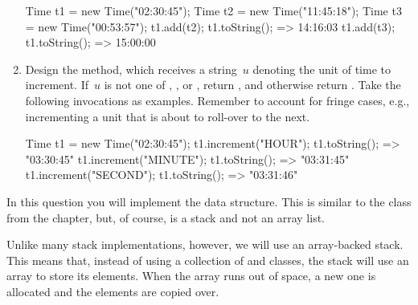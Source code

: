\begin{enumerate}[label=(\alph*)]
\begin{verbnobox}[\small]
Time t1 = new Time("02:30:45");
Time t2 = new Time("11:45:18");
Time t3 = new Time("00:53:57");
t1.add(t2);
t1.toString(); => 14:16:03
t1.add(t3);
t1.toString(); => 15:00:00
  \end{verbnobox}
  \item Design the  method, which receives a string~$u$ denoting the unit of time to increment. If~$u$ is not one of , , or , return , and otherwise return . Take the following invocations as examples. Remember to account for fringe cases, e.g., incrementing a unit that is about to roll-over to the next.
\begin{verbnobox}[\small]
Time t1 = new Time("02:30:45");
t1.increment("HOUR");
t1.toString(); => "03:30:45"
t1.increment("MINUTE");
t1.toString(); => "03:31:45"
t1.increment("SECOND");
t1.toString(); => "03:31:46"
\end{verbnobox}
\end{enumerate}



In this question you will implement the  data structure. This is similar to the  class from the chapter, but, of course, is a stack and not an array list.

Unlike many stack implementations, however, we will use an array-backed stack. This means that, instead of using a collection of  and   classes, the stack will use an array to store its elements. When the array runs out of space, a new one is allocated and the elements are copied over. 


